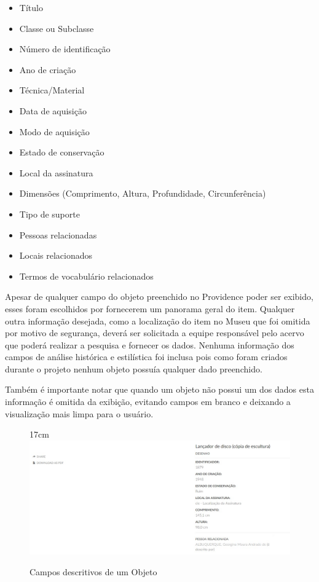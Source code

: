 \documentclass[a4paper,12pt,oneside,onecolumn,final,fleqn]{repUERJ}
\begin{document}
\begin{itemize}
	\item Título
	\item Classe ou Subclasse
	\item Número de identificação
	\item Ano de criação
	\item Técnica/Material
	\item Data de aquisição
	\item Modo de aquisição
	\item Estado de conservação
	\item Local da assinatura
	\item Dimensões (Comprimento, Altura, Profundidade, Circunferência)
	\item Tipo de suporte
	\item Pessoas relacionadas
	\item Locais relacionados
	\item Termos de vocabulário relacionados
\end{itemize}

Apesar de qualquer campo do objeto preenchido no Providence poder ser exibido, esses foram escolhidos por fornecerem um panorama geral do item. Qualquer outra informação desejada, como a localização do item no Museu que foi omitida por motivo de segurança, deverá ser solicitada a equipe responsável pelo acervo que poderá realizar a pesquisa e fornecer os dados. Nenhuma informação dos campos de análise histórica e estilística foi inclusa pois como foram criados durante o projeto nenhum objeto possuía qualquer dado preenchido.

Também é importante notar que quando um objeto não possui um dos dados esta informação é omitida da exibição, evitando campos em branco e deixando a visualização mais limpa para o usuário.

\begin{figure}[!ht]{17cm}
	\includegraphics[width=15cm, center]{figuras/pawtucket_objeto.jpg}
	\caption{Campos descritivos de um Objeto} \label{fig:tela_obj}
\end{figure}
\end{document}
